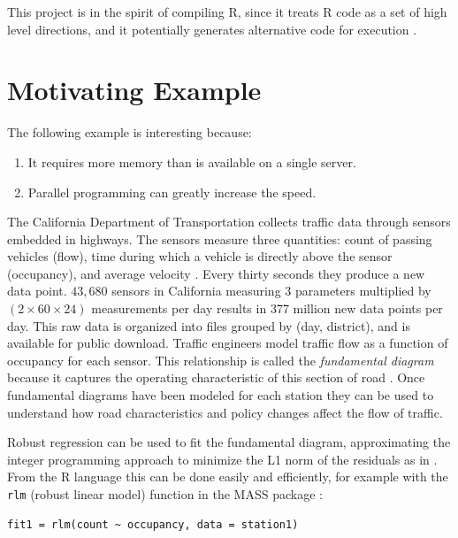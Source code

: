 \documentclass[12pt]{article}
\begin{document}
This project is in the spirit of compiling R, since it treats R code as
a set of high level directions, and it potentially generates alternative
code for execution \cite{lang2014enhancing}.

\section{Motivating Example}
\label{sec:pems}

The following example is interesting because:
\begin{enumerate}
    \item It requires more memory than is available on a single server.
    \item Parallel programming can greatly increase the speed.
\end{enumerate}

The California Department of Transportation collects traffic data through
sensors embedded in highways. The sensors measure three quantities: count
of passing vehicles (flow), time during which a vehicle is directly above the
sensor (occupancy), and average velocity \cite{jia2001pems}.  Every thirty
seconds they produce a new data point. $43,680$ sensors in California
measuring 3 parameters multiplied by $(2 \times 60 \times 24)$ measurements
per day results in 377 million new data points per day.  This raw data is
organized into files grouped by (day, district), and is available for
public download.  Traffic engineers model traffic flow as a function of
occupancy for each sensor. This relationship is called the \emph{fundamental
diagram} because it captures the operating characteristic of this section
of road \cite{daganzo1997fundamentals}. Once fundamental diagrams
have been modeled for each station they can be used to understand how road
characteristics and policy changes affect the flow of traffic.

Robust regression can be used to fit the fundamental diagram, approximating
the integer programming approach to minimize the L1 norm of the residuals as in
\cite{li2011fundamental}.  From the R language this can be done easily and
efficiently, for example with the \texttt{rlm} (robust linear model)
function in the MASS package \cite{venables2013modern}:

\begin{verbatim}
fit1 = rlm(count ~ occupancy, data = station1)
\end{verbatim}
\end{document}
